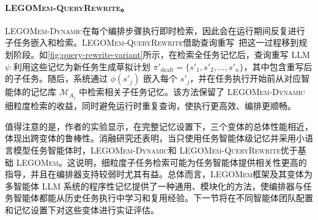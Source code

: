 \documentclass[10pt,twocolumn]{article}
\newcommand{\legomem}{\textsc{LEGOMem}}
\newcommand{\dynalegomem}{\textsc{LEGOMem-Dynamic}}
\newcommand{\queryrewritelegomem}{\textsc{LEGOMem-QueryRewrite}}
\begin{document}
\paragraph{\queryrewritelegomem。}
\dynalegomem 在每个编排步骤执行即时检索，因此会在运行期间反复进行子任务嵌入和检索。\queryrewritelegomem 借助查询重写~\cite{ma2023query, lidmqr}把这一过程移到规划阶段。如\autoref{fig:query-rewrite-variant}所示，在检索全任务记忆后，查询重写 LLM $\psi$ 利用这些记忆为新任务生成草拟计划 $\pi'_{\text{draft}}=\{s'_1,s'_2,\dots,s'_n\}$，其中包含重写后的子任务。随后，系统通过 $\phi(s'_j)$ 嵌入每个 $s'_j$，并在任务执行开始前从对应智能体的记忆库 $\mathcal{M}_{A_j}$ 中检索相关子任务记忆。该方法保留了 \dynalegomem 细粒度检索的收益，同时避免运行时重复查询，使执行更高效、编排更顺畅。

值得注意的是，作者的实验显示，在完整记忆设置下，三个变体的总体性能相近，体现出跨变体的鲁棒性。消融研究还表明，当只使用任务智能体级记忆并采用小语言模型任务智能体时，\dynalegomem 和 \queryrewritelegomem 优于基础 \legomem。这说明，细粒度子任务检索可能为任务智能体提供相关性更高的指导，并且在编排器支持较弱时尤其有益。总体而言，\legomem 框架及其变体为多智能体 LLM 系统的程序性记忆提供了一种通用、模块化的方法，使编排器与任务智能体都能从历史任务执行中学习和复用经验。下一节将在不同智能体团队配置和记忆设置下对这些变体进行实证评估。
\end{document}
